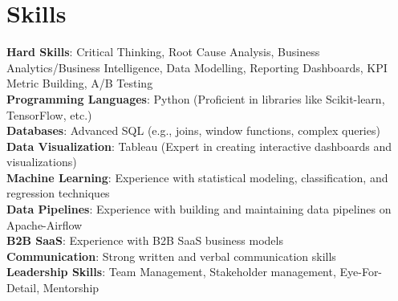 \section{Skills}
  \begin{itemize}[leftmargin=0.1in, label={}]
    \normalsize{\item{
      \textbf{Hard Skills}: Critical Thinking, Root Cause Analysis, Business Analytics/Business Intelligence, Data Modelling, Reporting Dashboards, KPI Metric Building, A/B Testing \\
      \textbf{Programming Languages}: Python (Proficient in libraries like Scikit-learn, TensorFlow, etc.) \\
      \textbf{Databases}: Advanced SQL (e.g., joins, window functions, complex queries) \\
      \textbf{Data Visualization}: Tableau (Expert in creating interactive dashboards and visualizations) \\
      \textbf{Machine Learning}: Experience with statistical modeling, classification, and regression techniques \\
      \textbf{Data Pipelines}: Experience with building and maintaining data pipelines on Apache-Airflow \\
      \textbf{B2B SaaS}: Experience with B2B SaaS business models \\
      \textbf{Communication}: Strong written and verbal communication skills \\
      \textbf{Leadership Skills}: Team Management, Stakeholder management, Eye-For-Detail, Mentorship \\
     }}
  \end{itemize}
\vspace{-18pt}